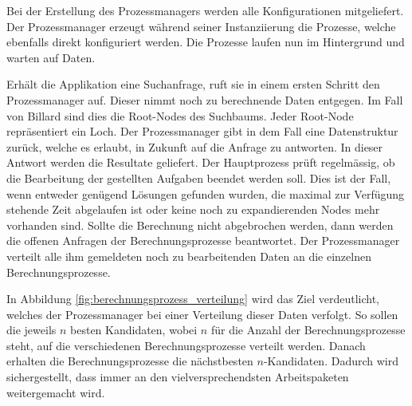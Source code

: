 Bei der Erstellung des Prozessmanagers werden alle Konfigurationen mitgeliefert.
Der Prozessmanager erzeugt während seiner Instanziierung die Prozesse, welche ebenfalls direkt konfiguriert werden.
Die Prozesse laufen nun im Hintergrund und warten auf Daten.

Erhält die Applikation eine Suchanfrage, ruft sie in einem ersten Schritt den Prozessmanager auf.
Dieser nimmt noch zu berechnende Daten entgegen. Im Fall von Billard sind dies die Root-Nodes des Suchbaums.
Jeder Root-Node repräsentiert ein Loch. Der Prozessmanager gibt in dem Fall eine Datenstruktur zurück, welche es erlaubt,
in Zukunft auf die Anfrage zu antworten. In dieser Antwort werden die Resultate geliefert.
Der Hauptprozess prüft regelmässig, ob die Bearbeitung der gestellten Aufgaben beendet werden soll.
Dies ist der Fall, wenn entweder genügend Lösungen gefunden wurden, die maximal zur Verfügung stehende Zeit abgelaufen ist
oder keine noch zu expandierenden Nodes mehr vorhanden sind.
Sollte die Berechnung nicht abgebrochen werden, dann werden die offenen Anfragen der Berechnungsprozesse beantwortet.
Der Prozessmanager verteilt alle ihm gemeldeten noch zu bearbeitenden Daten an die einzelnen Berechnungsprozesse.

In Abbildung \ref{fig:berechnungsprozess_verteilung} wird das Ziel verdeutlicht, welches der Prozessmanager bei einer
Verteilung dieser Daten verfolgt. So sollen die jeweils $n$ besten Kandidaten, wobei $n$ für die Anzahl der Berechnungsprozesse
steht, auf die verschiedenen Berechnungsprozesse verteilt werden. Danach erhalten die Berechnungsprozesse die nächstbesten
$n$-Kandidaten. Dadurch wird sichergestellt, dass immer an den vielversprechendsten Arbeitspaketen weitergemacht wird.

